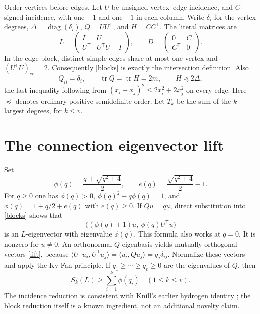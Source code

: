 \documentclass[11pt]{article}
\newcommand{\tr}{\operatorname{tr}}
\newcommand{\Sk}[2]{S_{#1}(#2)}
\begin{document}
Order vertices before edges. Let $U$ be unsigned vertex--edge incidence,
and $C$ signed incidence, with one $+1$ and one $-1$ in each column.
Write $\delta_i$ for the vertex degrees, $\Delta=\operatorname{diag}(\delta_i)$,
$Q=UU^{\mathsf T}$, and $H=CC^{\mathsf T}$. The literal matrices are
\begin{equation}\label{blocks}
 L=\begin{pmatrix}I&U\\U^{\mathsf T}&U^{\mathsf T}U-I\end{pmatrix},
 \qquad
 D=\begin{pmatrix}0&C\\C^{\mathsf T}&0\end{pmatrix}.
\end{equation}
In the edge block, distinct simple edges share at most one vertex and
$(U^{\mathsf T}U)_{ee}=2$. Consequently \eqref{blocks} is exactly the
intersection definition. Also
\begin{equation}\label{degrees}
 Q_{ii}=\delta_i,\qquad \tr Q=\tr H=2m,\qquad H\preceq2\Delta,
\end{equation}
the last inequality following from
$(x_i-x_j)^2\le2x_i^2+2x_j^2$ on every edge.
Here $\preceq$ denotes ordinary positive-semidefinite order.
Let $T_k$ be the sum of the $k$ largest degrees, for $k\le v$.

\section{The connection eigenvector lift}
Set
\[
 \phi(q)=\frac{q+\sqrt{q^2+4}}2,
 \qquad e(q)=\frac{\sqrt{q^2+4}}2-1.
\]
For $q\ge0$ one has $\phi(q)>0$,
$\phi(q)^2-q\phi(q)=1$, and
$\phi(q)=1+q/2+e(q)$ with $e(q)\ge0$.
If $Qu=qu$, direct substitution into \eqref{blocks} shows that
\begin{equation}\label{lift}
 \bigl((\phi(q)+1)u,\ \phi(q)U^{\mathsf T}u\bigr)
\end{equation}
is an $L$-eigenvector with eigenvalue $\phi(q)$.
This formula also works at $q=0$. It is nonzero for $u\ne0$.
An orthonormal $Q$-eigenbasis yields mutually orthogonal vectors
\eqref{lift}, because
$\langle U^{\mathsf T}u_i,U^{\mathsf T}u_j\rangle
=\langle u_i,Qu_j\rangle=q_j\delta_{ij}$.
Normalize these vectors and apply the Ky Fan principle. If
$q_1\ge\cdots\ge q_v\ge0$ are the eigenvalues of $Q$, then
\begin{equation}\label{positive-lower}
 \Sk{k}{L}\ge\sum_{i=1}^k\phi(q_i)\quad(1\le k\le v).
\end{equation}
The incidence reduction is consistent with Knill's earlier hydrogen
identity \cite[Theorem~1]{K18}; the block reduction itself is a known
ingredient, not an additional novelty claim.
\end{document}
